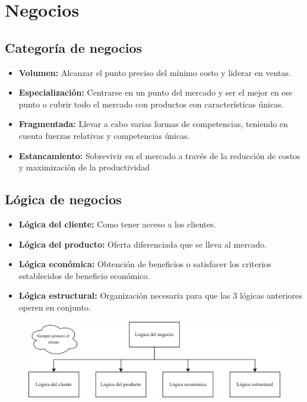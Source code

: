 \documentclass{templateNote}
\begin{document}
\section{Negocios}
\subsection{Categoría de negocios}
\begin{itemize}
    \item \textbf{Volumen:} Alcanzar el punto preciso del mínimo costo y liderar en ventas.
    \item \textbf{Especialización:} Centrarse en un punto del mercado y ser el mejor en ese punto o cubrir todo el mercado con productos con características únicas.
    \item \textbf{Fragmentada:} Llevar a cabo varias formas de competencias, teniendo en cuenta fuerzas relativas y competencias únicas.
    \item \textbf{Estancamiento:} Sobrevivir en el mercado a través de la reducción de costos y maximización de la productividad
\end{itemize}

\subsection{Lógica de negocios}
\begin{itemize}
    \item \textbf{Lógica del cliente:} Como tener acceso a los clientes.
    \item \textbf{Lógica del producto:} Oferta diferenciada que se lleva al mercado.
    \item \textbf{Lógica económica:} Obtención de beneficios o satisfacer los criterios establecidos de beneficio económico.
    \item \textbf{Lógica estructural:} Organización necesaria para que las 3 lógicas anteriores operen en conjunto.
\end{itemize}

\begin{figure}[H]
    \centering
    \includegraphics[width=1\textwidth]{img/logicanegocio.png}
\end{figure}
\end{document}
